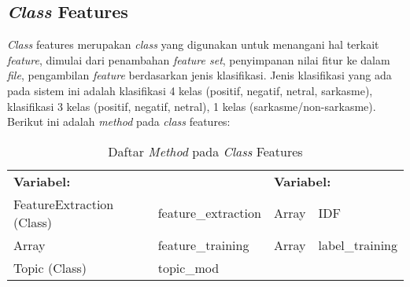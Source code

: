 \addtocounter{table}{-1}
\subsection{\textit{Class} Features}
\textit{Class }features merupakan \textit{class }yang digunakan untuk menangani hal terkait \textit{feature}, dimulai dari penambahan \textit{feature set}, penyimpanan nilai fitur ke dalam \textit{file}, pengambilan \textit{feature }berdasarkan jenis klasifikasi. Jenis klasifikasi yang ada pada sistem ini adalah klasifikasi 4 kelas 
(positif, negatif, netral, sarkasme), klasifikasi 3 kelas (positif, negatif, netral), 1 kelas (sarkasme/non-sarkasme). Berikut ini adalah \textit{method }pada \textit{class }features:
\begin{table}[H]
	\caption{Daftar \textit{Method} pada \textit{Class} Features}
	\centering
	\small
	\begin{adjustbox}{width=1\textwidth}	
	\begin{tabular}{|p{4.2cm} p{3cm} p{2cm} p{3cm}|}
		\hline
		\multicolumn{2}{|l}{\textbf{Variabel:}}&\multicolumn{2}{l|}{\textbf{Variabel:}}\\
		FeatureExtraction (Class)&feature\_extraction&Array&IDF\\
		Array&feature\_training&Array&label\_training\\
		Topic (Class)&topic\_mod& &\\
		\hline
	\end{tabular}
	\end{adjustbox}
\end{table}
